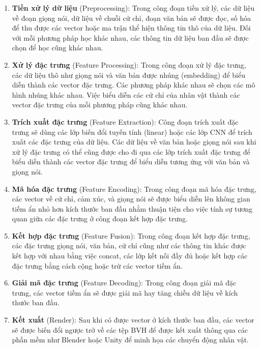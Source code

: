 \begin{enumerate}[label=\textbf{\arabic*.}]
	\item \textbf{Tiền xử lý dữ liệu} (Preprocessing): Trong công đoạn tiền xử lý, các dữ liệu về đoạn giọng nói, dữ liệu về chuỗi cử chỉ, đoạn văn bản sẽ được đọc, số hóa để thu được các vector hoặc ma trận thể hiện thông tin thô của dữ liệu. Đối với mỗi phương pháp học khác nhau, các thông tin dữ liệu ban đầu sẽ được chọn để học cũng khác nhau.
	
	\item \textbf{Xử lý đặc trưng} (Feature Processing): Trong công đoạn xử lý đặc trưng, các dữ liệu thô như giọng nói và văn bản được nhúng (embedding) để biểu diễn thành các vector đặc trưng. Các phương pháp khác nhau sẽ chọn các mô hình nhúng khác nhau. Việc biểu diễn các cử chỉ của nhân vật thành các vector đặc trưng của mỗi phương pháp cũng khác nhau.
	
	\item \textbf{Trích xuất đặc trưng} (Feature Extraction): Công đoạn trích xuất đặc trưng sẽ dùng các lớp biến đổi tuyến tính (linear) hoặc các lớp CNN để trích xuất các đặc trưng của dữ liệu. Các dữ liệu về văn bản hoặc giọng nói sau khi xử lý đặc trưng có thể cũng được cho đi qua các lớp trích xuất đặc trưng để biểu diễn thành các vector đặc trưng để biểu diễn tương ứng với văn bản và giọng nói.
	
	\item \textbf{Mã hóa đặc trưng} (Feature Encoding): Trong công đoạn mã hóa đặc trưng, các vector về cử chỉ, cảm xúc, và giọng nói sẽ được biểu diễn lên không gian tiềm ẩn nhỏ hơn kích thước ban đầu nhằm thuận tiện cho việc tính sự tương quan giữa các đặc trưng ở công đoạn kết hợp đặc trưng.
	
	\item \textbf{Kết hợp đặc trưng} (Feature Fusion): Trong công đoạn kết hợp đặc trưng, các đặc trưng giọng nói, văn bản, cử chỉ cũng như các thông tin khác được kết hợp với nhau bằng việc concat, các lớp kết nối đầy đủ hoặc kết hợp các đặc trưng bằng cách cộng hoặc trừ các vector tiềm ẩn.
	
	\item \textbf{Giải mã đặc trưng} (Feature Decoding): Trong công đoạn giải mã đặc trưng, các vector tiềm ẩn sẽ được giải mã hay tăng chiều dữ liệu về kích thước ban đầu.
	
	\item \textbf{Kết xuất} (Render): Sau khi có được vector ở kích thước ban đầu, các vector sẽ được biến đổi ngược trở về các tệp BVH để được kết xuất thông qua các phần mềm như Blender hoặc Unity để minh họa các chuyển động nhân vật.
\end{enumerate}

